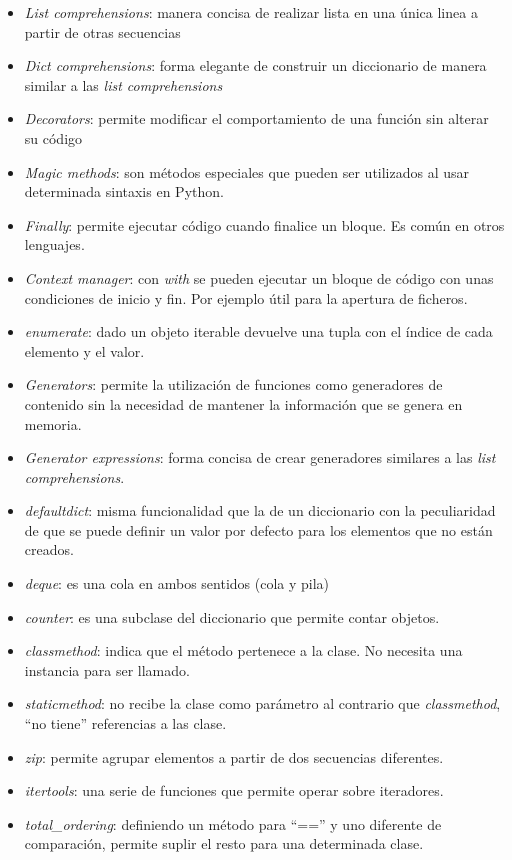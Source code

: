 \documentclass[a4paper, 12pt]{book}
\begin{document}
\begin{itemize}
    \item \textit{List comprehensions}: manera concisa de realizar lista en una única linea a partir de otras secuencias
    \item \textit{Dict comprehensions}: forma elegante de construir un diccionario de manera similar a las \textit{list comprehensions}
    \item \textit{Decorators}: permite modificar el comportamiento de una función sin alterar su código
    \item \textit{Magic methods}: son métodos especiales que pueden ser utilizados al usar determinada sintaxis en Python.
    \item \textit{Finally}: permite ejecutar código cuando finalice un bloque. Es común en otros lenguajes.
    \item \textit{Context manager}: con \textit{with} se pueden ejecutar un bloque de código con unas condiciones de inicio y fin. Por ejemplo útil para la apertura de ficheros.
    \item \textit{enumerate}: dado un objeto iterable devuelve una tupla con el índice de cada elemento y el valor.
    \item \textit{Generators}: permite la utilización de funciones como generadores de contenido sin la necesidad de mantener la información que se genera en memoria.
    \item \textit{Generator expressions}: forma concisa de crear generadores similares a las \textit{list comprehensions}.
    \item \textit{defaultdict}: misma funcionalidad que la de un diccionario con la peculiaridad de que se puede definir un valor por defecto para los elementos que no están creados.
    \item \textit{deque}: es una cola en ambos sentidos (cola y pila)
    \item \textit{counter}: es una subclase del diccionario que permite contar objetos.
    \item \textit{classmethod}: indica que el método pertenece a la clase. No necesita una instancia para ser llamado.
    \item \textit{staticmethod}: no recibe la clase como parámetro al contrario que \textit{classmethod}, ``no tiene'' referencias a las clase.
    \item \textit{zip}: permite agrupar elementos a partir de dos secuencias diferentes.
    \item \textit{itertools}: una serie de funciones que permite operar sobre iteradores.
    \item \textit{total\_ordering}: definiendo un método para ``=='' y uno diferente de comparación, permite suplir el resto para una determinada clase.
\end{itemize}
\end{document}
